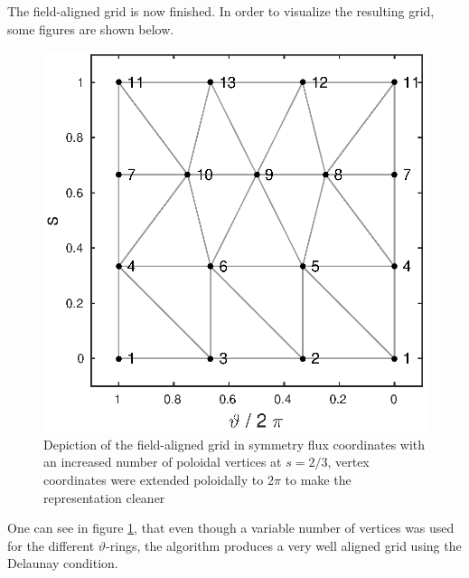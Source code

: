 \documentclass[./main.tex]{subfiles}
\begin{document}
The field-aligned grid is now finished. In order to visualize the resulting grid, some figures are shown below.
\newpage
\begin{figure}[!ht]
	\includegraphics[width=1\textwidth]{figures/Delaunay_Connected_PrismFaces.eps}
	\caption{Depiction of the field-aligned grid in symmetry flux coordinates with an increased number of poloidal vertices at $s=2/3$, vertex coordinates were extended poloidally to 2$\pi$ to make the representation cleaner}
	\label{fig:Delaunay_Connected_Faces}
\end{figure}

One can see in figure \ref{fig:Delaunay_Connected_Faces}, that even though a variable number of vertices was used for the different $\vartheta$-rings, the algorithm produces a very well aligned grid using the Delaunay condition.
\end{document}
